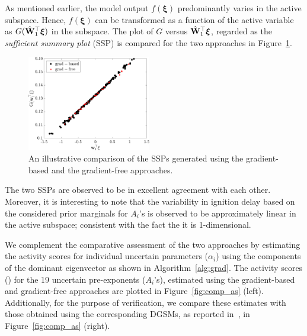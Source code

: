 As mentioned earlier, the model output $f(\bm{\xi})$ predominantly varies in the active subspace. Hence, 
$f(\bm{\xi})$ can be transformed as a function of the active variable as $G(\hat{\mathbf{{W}}}_1^\top\bm{\xi})$ in
the subspace. The plot of $G$ versus $\hat{\mathbf{{W}}}_1^\top\bm{\xi}$, regarded as the \textit{sufficient summary plot} (SSP) is 
compared for the two approaches in Figure~\ref{fig:comp_ssp}.
%
\begin{figure}[htbp]
 \begin{center}
  \includegraphics[width=0.48\textwidth]{./Figures/comp_ssp}
\caption{An illustrative comparison of the SSPs generated using the gradient-based and the gradient-free approaches.}
\label{fig:comp_ssp}
\end{center}
\end{figure}
%
The two SSPs are observed to be in excellent agreement with each other. Moreover, it is interesting to note
that the variability in ignition
delay based on the considered prior marginals for $A_i$'s is observed to be approximately linear in the
active subspace; consistent with the fact the it is 1-dimensional.

We complement the comparative assessment of the two approaches by estimating
the activity scores for individual uncertain parameters ($\alpha_i$) using the
components of the dominant eigenvector as shown in Algorithm~\ref{alg:grad}.
The activity scores () for the 19 uncertain pre-exponents ($A_i$'s), estimated
using the gradient-based and gradient-free approaches are plotted in
Figure~\ref{fig:comp_as} (left).  Additionally, for the purpose of
verification, we compare these estimates with those obtained using the
corresponding DGSMs, as reported in~\cite{Vohra:2018}, in
Figure~\ref{fig:comp_as} (right). 

